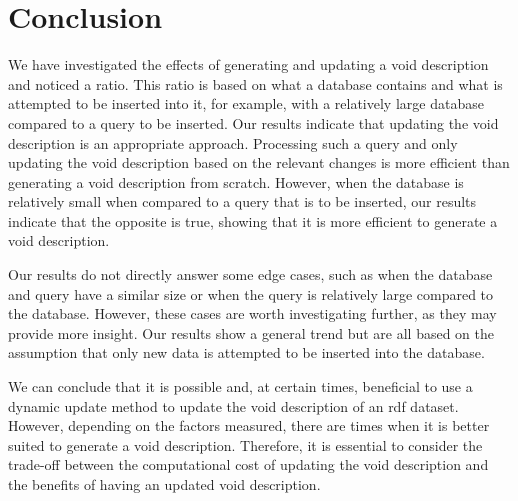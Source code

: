 \section{Conclusion}\label{sec:conclusion}
We have investigated the effects of generating and updating a \gls{void} description and noticed a ratio. This ratio is based on what a database contains and what is attempted to be inserted into it, for example, with a relatively large database compared to a query to be inserted. Our results indicate that updating the \gls{void} description is an appropriate approach. Processing such a query and only updating the \gls{void} description based on the relevant changes is more efficient than generating a \gls{void} description from scratch. However, when the database is relatively small when compared to a query that is to be inserted, our results indicate that the opposite is true, showing that it is more efficient to generate a \gls{void} description.

Our results do not directly answer some edge cases, such as when the database and query have a similar size or when the query is relatively large compared to the database. However, these cases are worth investigating further, as they may provide more insight.
Our results show a general trend but are all based on the assumption that only new data is attempted to be inserted into the database.

We can conclude that it is possible and, at certain times, beneficial to use a dynamic update method to update the \gls{void} description of an \gls{rdf} dataset. However, depending on the factors measured, there are times when it is better suited to generate a \gls{void} description. Therefore, it is essential to consider the trade-off between the computational cost of updating the \gls{void} description and the benefits of having an updated \gls{void} description.

